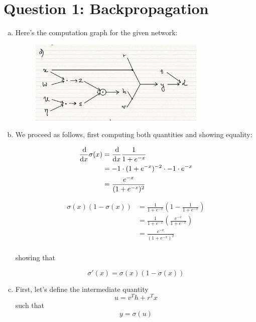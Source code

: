 \documentclass{article}
\begin{document}
\section*{Question 1: Backpropagation}

\begin{enumerate}[(a)]
    \item Here's the computation graph for the given network:
    
    \begin{figure}[H]
        \centering
        \includegraphics[width=0.8\textwidth]{../q1_graph.png}
    \end{figure}

    \item We proceed as follows, first computing both quantities and showing equality: 
    
    \begin{align*}
        \frac{\dif}{\dif x} \sigma(x) &= \frac{\dif}{\dif x} \frac{1}{1 + e^{-x}} \\
        &= -1 \cdot (1 + e^{-x})^{-2} \cdot -1 \cdot e^{-x}\\
        &= \frac{e^{-x}}{(1 + e^{-x})^2} \\
    \end{align*}

    \begin{align*}
        \sigma(x) (1 - \sigma(x)) &= \frac{1}{1 + e^{-x}} \left(1 - \frac{1}{1 + e^{-x}}\right) \\
        &= \frac{1}{1 + e^{-x}} \left(\frac{e^{-x}}{1 + e^{-x}}\right) \\
        &= \frac{e^{-x}}{(1 + e^{-x})^2} \\
    \end{align*}

    showing that

    \[\sigma'(x) = \sigma(x) (1 - \sigma(x))\]

    \item First, let's define the intermediate quantity \[u = v^T h + r^T x\]
    such that \[y = \sigma(u)\]
    

\end{enumerate}
\end{document}
